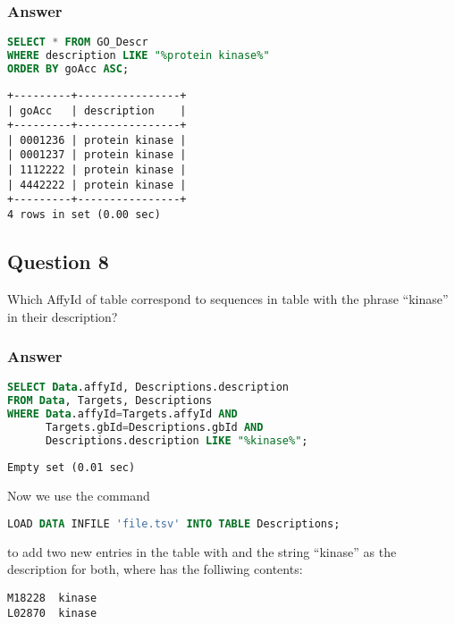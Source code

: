\subsubsection*{Answer}

\begin{lstlisting}[language=sql]
SELECT * FROM GO_Descr
WHERE description LIKE "%protein kinase%"
ORDER BY goAcc ASC;
\end{lstlisting}

\begin{lstlisting}[style=output]
+---------+----------------+
| goAcc   | description    |
+---------+----------------+
| 0001236 | protein kinase |
| 0001237 | protein kinase |
| 1112222 | protein kinase |
| 4442222 | protein kinase |
+---------+----------------+
4 rows in set (0.00 sec)
\end{lstlisting}

\subsection*{Question 8}
Which AffyId of table  correspond to sequences in  table with the phrase “kinase” in their description?

\subsubsection*{Answer}

\begin{lstlisting}[language=sql]
SELECT Data.affyId, Descriptions.description
FROM Data, Targets, Descriptions
WHERE Data.affyId=Targets.affyId AND
      Targets.gbId=Descriptions.gbId AND
      Descriptions.description LIKE "%kinase%";
\end{lstlisting}

\begin{lstlisting}[style=output]
Empty set (0.01 sec)
\end{lstlisting}

Now we use the command
\begin{lstlisting}[language=sql]
LOAD DATA INFILE 'file.tsv' INTO TABLE Descriptions;
\end{lstlisting}
to add two new entries in the  table with  and the string “kinase” as the description for both, where  has the folliwing contents:
\begin{lstlisting}[language={}, showtabs=true]
M18228	kinase
L02870	kinase
\end{lstlisting}

